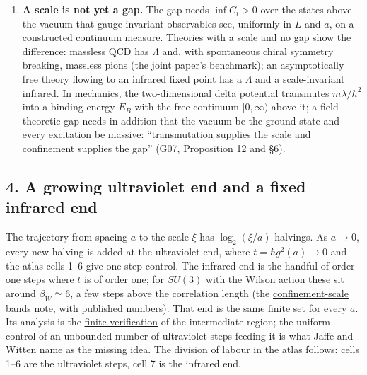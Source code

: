 \documentclass[11pt,a4paper]{article}
\begin{document}
\begin{enumerate}
  from two scale-free structures that fail to commute (G07 §1;
  \href{action-floor-yang-mills-gap.md}{G08}). Below four dimensions the
  classical coupling carries the unit; in \(1+3\) transmutation
  manufactures it from \(\hbar\) non-algebraically, which is why a
  \(1+3\) gap together with \(c\) returns no action unit (G08's
  action-critical case), unlike \(G\), \(c\) and \(l_P\).
\item
  \textbf{A scale is not yet a gap.} The gap needs \(\inf C_i>0\) over
  the states above the vacuum that gauge-invariant observables see,
  uniformly in \(L\) and \(a\), on a constructed continuum measure.
  Theories with a scale and no gap show the difference: massless QCD has
  \(\Lambda\) and, with spontaneous chiral symmetry breaking, massless
  pions (the joint paper's benchmark); an asymptotically free theory
  flowing to an infrared fixed point has a \(\Lambda\) and a
  scale-invariant infrared. In mechanics, the two-dimensional delta
  potential transmutes \(m\lambda/\hbar^2\) into a binding energy
  \(E_B\) with the free continuum \([0,\infty)\) above it; a
  field-theoretic gap needs in addition that the vacuum be the ground
  state and every excitation be massive: ``transmutation supplies the
  scale and confinement supplies the gap'' (G07, Proposition 12 and §6).
\end{enumerate}

\hypertarget{a-growing-ultraviolet-end-and-a-fixed-infrared-end}{%
\subsection{4. A growing ultraviolet end and a fixed infrared
end}\label{a-growing-ultraviolet-end-and-a-fixed-infrared-end}}

The trajectory from spacing \(a\) to the scale \(\xi\) has
\(\log_2(\xi/a)\) halvings. As \(a\to0\), every new halving is added at
the ultraviolet end, where \(t=\hbar g^2(a)\to0\) and the atlas cells
1--6 give one-step control. The infrared end is the handful of order-one
steps where \(t\) is of order one; for \(SU(3)\) with the Wilson action
these sit around \(\beta_W\simeq6\), a few steps above the correlation
length (the \href{confinement-scale-bands.md}{confinement-scale bands
note}, with published numbers). That end is the same finite set for
every \(a\). Its analysis is the
\href{intermediate-region-finite-verification.md}{finite verification}
of the intermediate region; the uniform control of an unbounded number
of ultraviolet steps feeding it is what Jaffe and Witten name as the
missing idea. The division of labour in the atlas follows: cells 1--6
are the ultraviolet steps, cell 7 is the infrared end.
\end{document}
